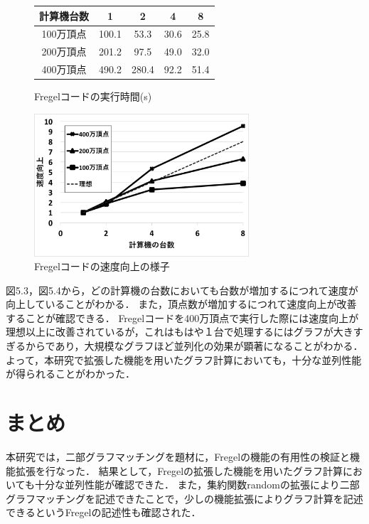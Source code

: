 \documentclass[12pt]{ujreport}
\begin{document}
\begin{figure}[ht]
  \begin{minipage}{0.45\textwidth}
    \begin{center}
      \makeatletter
      \def\@captype{table}
      \makeatother
      \begin{tabular}{|c||c|c|c|c|}\hline
        計算機台数 & 1 & 2 & 4 & 8\\ \hline
        100万頂点 & 100.1 & 53.3 & 30.6 & 25.8 \\ \hline
        200万頂点 & 201.2 & 97.5 & 49.0 & 32.0 \\ \hline
        400万頂点 & 490.2 & 280.4 & 92.2 & 51.4  \\ \hline
      \end{tabular}
      \caption{Fregelコードの実行時間(s)}
    \end{center}
  \end{minipage}
  \begin{minipage}{0.8\textwidth}
    \begin{center}
      \includegraphics[width = 8cm]{hanFregel.png}
      \caption{Fregelコードの速度向上の様子}
    \end{center}
  \end{minipage}
\end{figure}
\newpage

図5.3，図5.4から，どの計算機の台数においても台数が増加するにつれて速度が向上していることがわかる．
また，頂点数が増加するにつれて速度向上が改善することが確認できる．
Fregelコードを400万頂点で実行した際には速度向上が理想以上に改善されているが，これはもはや１台で処理するにはグラフが大きすぎるからであり，大規模なグラフほど並列化の効果が顕著になることがわかる．
よって，本研究で拡張した機能を用いたグラフ計算においても，十分な並列性能が得られることがわかった．

\newpage

\chapter{まとめ}
本研究では，二部グラフマッチングを題材に，Fregelの機能の有用性の検証と機能拡張を行なった．
結果として，Fregelの拡張した機能を用いたグラフ計算においても十分な並列性能が確認できた．
また，集約関数randomの拡張により二部グラフマッチングを記述できたことで，少しの機能拡張によりグラフ計算を記述できるというFregelの記述性も確認された．
\end{document}
